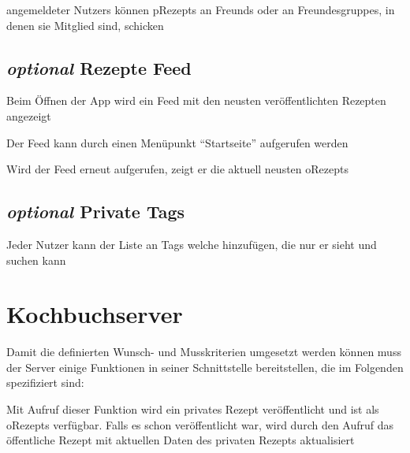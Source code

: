 	\Glspl{angemeldeter Nutzer} können \glspl{pRezept} an \glspl{Freund} oder an \glspl{Freundesgruppe}, in denen sie Mitglied sind, schicken
		
		
	\subsection{{\em optional} Rezepte Feed}
	
		Beim Öffnen der App wird ein \gls{Feed} mit den neusten veröffentlichten Rezepten angezeigt 
		
		
		Der \gls{Feed} kann durch einen Menüpunkt "`Startseite"' aufgerufen werden
	
		Wird der \gls{Feed} erneut aufgerufen, zeigt er die aktuell neusten \glspl{oRezept}
		
	\subsection{{\em optional} Private Tags}
			
			Jeder Nutzer kann der Liste an Tags welche hinzufügen, die nur er sieht und suchen kann
		


\section{Kochbuchserver}
Damit die definierten Wunsch- und Musskriterien umgesetzt werden können muss der Server einige Funktionen in seiner
Schnittstelle bereitstellen, die im Folgenden spezifiziert sind:





  Mit Aufruf dieser Funktion wird ein privates Rezept veröffentlicht und ist als \glspl{oRezept} 
  verfügbar.
	Falls es schon veröffentlicht war, wird durch den Aufruf das öffentliche Rezept mit aktuellen
 Daten des privaten Rezepts aktualisiert
 
